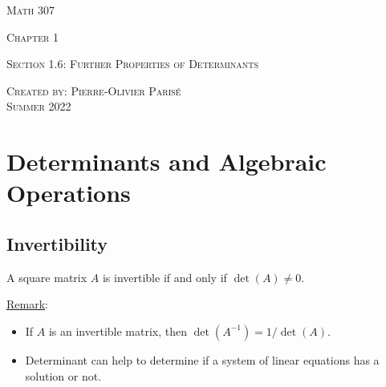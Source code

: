 \documentclass[12pt,a4paper]{article}
\begin{document}
\thispagestyle{empty}

\begin{center}
\vspace*{2.5cm}

{\Huge \textsc{Math 307}}

\vspace*{2cm}

{\LARGE \textsc{Chapter 1}} 

\vspace*{0.75cm}

\noindent\textsc{Section 1.6: Further Properties of Determinants}

\vspace*{0.75cm}

\tableofcontents

\vfill

\noindent \textsc{Created by: Pierre-Olivier Paris{\'e}} \\
\textsc{Summer 2022}
\end{center}

\newpage

\section{Determinants and Algebraic Operations}

	\subsection{Invertibility}
	
	A square matrix $A$ is invertible if and only if $\det (A) \neq 0$.
	
	\vspace*{16pt}
	
	\noindent\underline{Remark}: 
	\begin{itemize}
	\item If $A$ is an invertible matrix, then $\det (A^{-1}) = 1/\det (A)$.
	\item Determinant can help to determine if a system of linear equations has a solution or not.
	\end{itemize}
	
	\vspace*{16pt}
	
\end{document}
